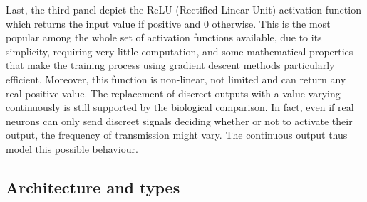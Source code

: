 \documentclass[a4paper,10pt]{report}
\begin{document}
Last, the third panel depict the ReLU (Rectified Linear Unit) activation function which returns the input value if 
positive and 0 otherwise. This is the most popular among the whole set of activation functions available, due to its simplicity, requiring very little computation, and some mathematical properties that make the training process using gradient
descent methods particularly efficient.
Moreover, this function is non-linear, not limited and can return any real positive value.
The replacement of discreet outputs with a value varying continuously is still supported by the biological comparison.
In fact, even if real neurons can only send discreet signals deciding whether or not to activate their output, 
the frequency of transmission might vary. The continuous output thus model this possible behaviour.

\subsection{Architecture and types}
\end{document}
